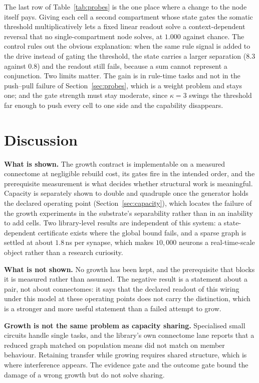 \documentclass[11pt]{article}
\theoremstyle{remark}
\begin{document}
The last row of Table~\ref{tab:probes} is the one place where a change to the node itself pays. Giving
each cell a second compartment whose state gates the somatic threshold multiplicatively lets a fixed
linear readout solve a context-dependent reversal that no single-compartment node solves, at $1.000$
against chance. The control rules out the obvious explanation: when the same rule signal is added to
the drive instead of gating the threshold, the state carries a larger separation ($8.3$ against $0.8$)
and the readout still fails, because a sum cannot represent a conjunction. Two limits matter. The gain
is in rule-time tasks and not in the push--pull failure of Section~\ref{sec:probes}, which is a weight
problem and stays one; and the gate strength must stay moderate, since $\kappa=3$ swings the threshold
far enough to push every cell to one side and the capability disappears.

\section{Discussion}

\textbf{What is shown.} The growth contract is implementable on a measured connectome at negligible
rebuild cost, its gates fire in the intended order, and the prerequisite measurement is what decides
whether structural work is meaningful. Capacity is separately shown to double and quadruple once the
generator holds the declared operating point (Section~\ref{sec:capacity}), which locates the failure
of the growth experiments in the substrate's separability rather than in an inability to add cells. Two library-level results are independent of this system: a
state-dependent certificate exists where the global bound fails, and a sparse graph is settled at
about $1.8$\,ns per synapse, which makes $10{,}000$ neurons a real-time-scale object rather than a
research curiosity.

\textbf{What is not shown.} No growth has been kept, and the prerequisite that blocks it is
measured rather than assumed. The negative result is a statement about a pair, not about
connectomes: it says that the declared readout of this wiring under this model at these operating
points does not carry the distinction, which is a stronger and more useful statement than a failed
attempt to grow.

\textbf{Growth is not the same problem as capacity sharing.} Specialised small circuits handle
single tasks, and the library's own connectome lane reports that a reduced graph matched on
population means did not match on member behaviour. Retaining transfer while growing requires shared
structure, which is where interference appears. The evidence gate and the outcome gate bound the
damage of a wrong growth but do not solve sharing.
\end{document}
